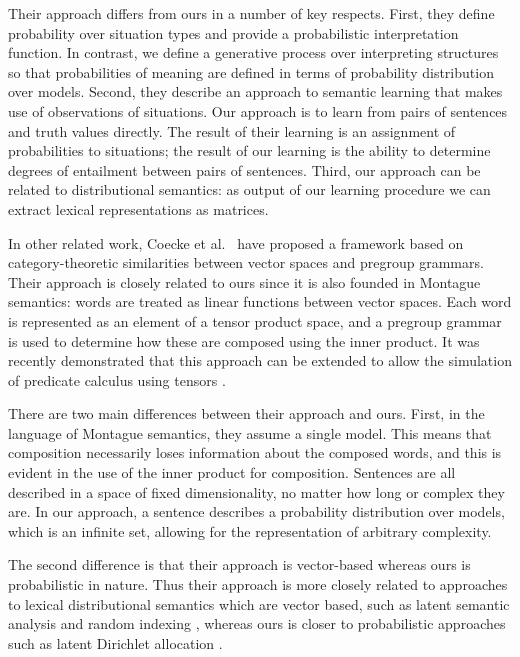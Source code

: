 \documentclass[11pt]{article}
\theoremstyle{definition}
\begin{document}
Their approach differs from ours in a number of key respects. First, they define probability over situation types and provide a probabilistic interpretation function. In contrast, we define a generative process over interpreting structures so that probabilities of meaning are defined in terms of probability distribution over models. Second, they describe an approach to semantic learning that makes use of observations of situations. Our approach is to learn from pairs of sentences and truth values directly. The result of their learning is an assignment of probabilities to situations; the result of our learning is the ability to determine degrees of entailment between pairs of sentences. Third, our approach can be related to distributional semantics: as output of our learning procedure we can extract lexical representations as matrices.

In other related work, Coecke et al.~\cite{Coecke:10} have proposed a framework based on category-theoretic
similarities between vector spaces and pregroup grammars. Their
approach is closely related to ours since it is also
founded in Montague semantics: words are treated as linear functions
between vector spaces. Each word is represented as an element of a
tensor product space, and a pregroup grammar is used to determine how
these are composed using the inner product. It was recently
demonstrated that this approach can be extended to allow the
simulation of predicate calculus using
tensors \cite{Grefenstette:13}.

There are two main differences between their approach and ours. First,
in the language of Montague semantics, they assume a single
model. This means that composition necessarily loses information about
the composed words, and this is evident in the use of the inner
product for composition. Sentences are all described in a space of
fixed dimensionality, no matter how long or complex they are. In our
approach, a sentence describes a probability distribution over models,
which is an infinite set, allowing for the representation of arbitrary
complexity.

The second difference is that their approach is vector-based whereas
ours is probabilistic in nature. Thus their approach is more
closely related to approaches to lexical distributional semantics
which are vector based, such as latent semantic analysis
\cite{Deerwester:90} and random indexing \cite{Sahlgren:02}, whereas
ours is closer to probabilistic approaches such as latent Dirichlet
allocation \cite{Blei:03}.
\end{document}
